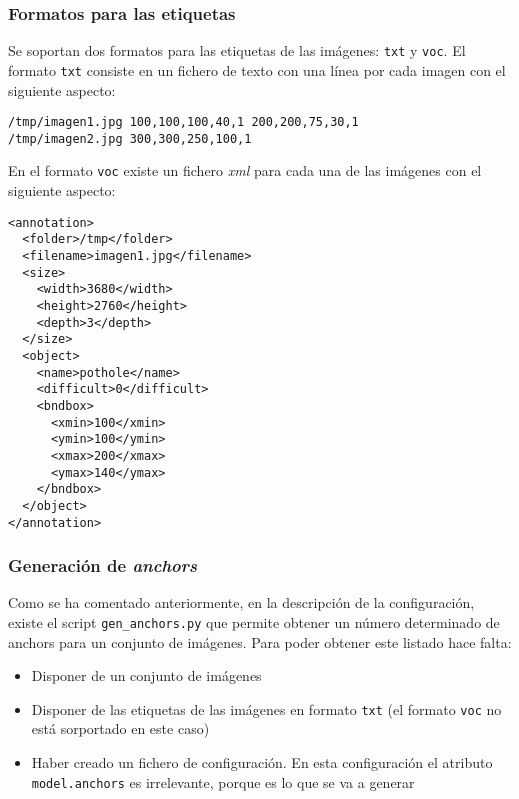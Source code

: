 \subsubsection*{Formatos para las etiquetas}

Se soportan dos formatos para las etiquetas de las imágenes: \texttt{txt} y \texttt{voc}. El formato \texttt{txt} consiste en un fichero de texto con una línea por cada imagen con el siguiente aspecto:

\begin{lstlisting}[frame=single, basicstyle=\ttfamily\footnotesize, caption={Ejemplo de fichero con las etiquetas en formato txt. La primera de las imágenes tiene 2 etiquetas, la primera está ubicada en la posición (100, 100) y tiene unas dimensiones de 100x40 píxeles. La segunda etiqueta está ubicada en la posición (200, 200) y tiene unas dimensiones de 75x30 píxeles. La segunda imagen tiene una única etiqueta ubicada en (300, 300) con dimensiones 250x100. Todas las etiquetas son de la clase 1}, captionpos=b]
/tmp/imagen1.jpg 100,100,100,40,1 200,200,75,30,1
/tmp/imagen2.jpg 300,300,250,100,1
\end{lstlisting}

En el formato \texttt{voc} existe un fichero \textit{xml} para cada una de las imágenes con el siguiente aspecto:

\begin{lstlisting}[frame=single, basicstyle=\ttfamily\footnotesize, caption={Ejemplo de fichero con las etiquetas en formato voc}, captionpos=b]
<annotation>
  <folder>/tmp</folder>
  <filename>imagen1.jpg</filename>
  <size>
    <width>3680</width>
    <height>2760</height>
    <depth>3</depth>
  </size>
  <object>
    <name>pothole</name>
    <difficult>0</difficult>
    <bndbox>
      <xmin>100</xmin>
      <ymin>100</ymin>
      <xmax>200</xmax>
      <ymax>140</ymax>
    </bndbox>
  </object>
</annotation>
\end{lstlisting}

\subsubsection*{Generación de \textit{anchors}}

Como se ha comentado anteriormente, en la descripción de la configuración, existe el script \texttt{gen\_anchors.py} que permite obtener un número determinado de anchors para un conjunto de imágenes. Para poder obtener este listado hace falta:

\begin{itemize}
	\item Disponer de un conjunto de imágenes
	\item Disponer de las etiquetas de las imágenes en formato \texttt{txt} (el formato \texttt{voc} no está sorportado en este caso)
	\item Haber creado un fichero de configuración. En esta configuración el atributo \texttt{model.anchors} es irrelevante, porque es lo que se va a generar
\end{itemize}

